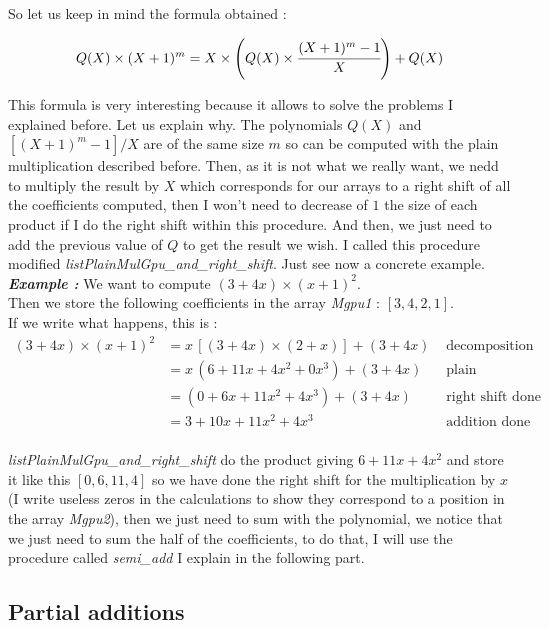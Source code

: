 So let us keep in mind the formula obtained :

$$Q(X) \times (X+1)^{m} = X \times \left( Q(X) \times \cfrac{(X+1)^{m} - 1}{X} \right) + Q(X)$$

This formula is very interesting because it allows to solve the problems I explained before. Let us explain why. The polynomials $Q(X)$ and $[(X+1)^{m} - 1]/X$ are of the same size $m$ so can be computed with the plain multiplication described before. Then, as it is not what we really want, we nedd to multiply the result by $X$ which corresponds for our arrays to a right shift of all the coefficients computed, then I won't need to decrease of $1$ the size of each product if I do the right shift within this procedure. And then, we just need to add the previous value of $Q$ to get the result we wish. I called this procedure modified \textit{listPlainMulGpu\_and\_right\_shift}. Just see now a concrete example.\\

\textit{\textbf{Example :}} 
We want to compute $(3+4x) \times (x+1)^2$.\\
Then we store the following coefficients in the array \textit{Mgpu1} : $[3,4,2,1]$.\\
If we write what happens, this is : \\

\begin{align*}
(3+4x) \times (x+1)^2 &= x\,[(3+4x) \times (2+x)] + (3+4x) & \mbox{ decomposition to simplify the problem }\\
&= x\,(6+11x+4x^2+0x^3) + (3+4x) & \mbox{ plain multiplication done }\\
&= (0+6x+11x^2+4x^3) + (3+4x) & \mbox{ right shift done }\\
&= 3+10x+11x^2+4x^3 & \mbox{ addition done }\\
\end{align*}

\textit{listPlainMulGpu\_and\_right\_shift} do the product giving $6+11x+4x^2$ and store it like this $[0,6,11,4]$ so we have done the right shift for the multiplication by $x$ (I write useless zeros in the calculations to show they correspond to a position in the array \textit{Mgpu2}), then we just need to sum with the polynomial, we notice that we just need to sum the half of the coefficients, to do that, I will use the procedure called \textit{semi\_add} I explain in the following part.


\subsection{Partial additions}

